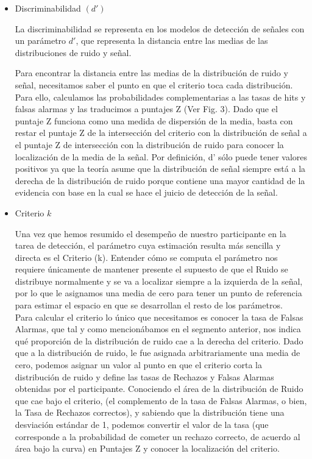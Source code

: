 \begin{itemize}
\item Discriminabilidad $(d')$

La discriminabilidad se representa en los modelos de detección de señales con un parámetro $d'$, que representa la distancia entre las medias de las distribuciones de ruido y señal. 

Para encontrar la distancia entre las medias de la distribución de ruido y señal, necesitamos saber el punto en que el criterio toca cada distribución. Para ello, calculamos las probabilidades complementarias a las tasas de hits y falsas alarmas y las traducimos a puntajes Z (Ver Fig. 3). Dado que el puntaje Z funciona como una medida de dispersión de la media, basta con restar el puntaje Z de la intersección del criterio con la distribución de señal a el puntaje Z de intersección con la distribución de ruido para conocer la localización de la media de la señal. Por definición, d’ sólo puede tener valores positivos ya que la teoría asume que la distribución de señal siempre está a la derecha de la distribución de ruido porque contiene una mayor cantidad de la evidencia con base en la cual se hace el juicio de detección de la señal.



\item Criterio  $k$

Una vez que hemos resumido el desempeño de nuestro participante en la tarea de detección, el parámetro cuya estimación resulta más sencilla y directa es el Criterio (k). Entender cómo se computa el parámetro nos requiere únicamente de mantener presente el supuesto de que el Ruido se distribuye normalmente y se va a localizar siempre a la izquierda de la señal, por lo que le asignamos una media de cero para tener un punto de referencia para estimar el espacio en que se desarrollan el resto de los parámetros. \\

Para calcular el criterio lo único que necesitamos es conocer la tasa de Falsas Alarmas, que tal y como mencionábamos en el segmento anterior, nos indica qué proporción de la distribución de ruido cae a la derecha del criterio. Dado que a la distribución de ruido, le fue asignada arbitrariamente una media de cero, podemos asignar un valor al punto en que el criterio corta la distribución de ruido y define las tasas de Rechazos y Falsas Alarmas obtenidas por el participante. Conociendo el área de la distribución de Ruido que cae bajo el criterio, (el complemento de la tasa de Falsas Alarmas, o bien, la Tasa de Rechazos correctos), y sabiendo que la distribución tiene una desviación estándar de 1, podemos convertir el valor de la tasa (que corresponde a la probabilidad de cometer un rechazo correcto, de acuerdo al área bajo la curva) en Puntajes Z y conocer la localización del criterio.\\


\end{itemize}
